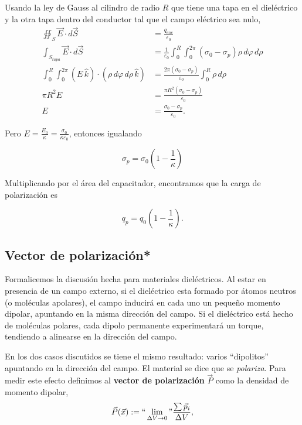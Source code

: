 Usando la ley de Gauss al cilindro de radio $R$ que tiene una tapa en el dieléctrico y la otra tapa dentro del conductor tal que el campo eléctrico sea nulo,
\begin{align*}
    \oiint_S \Vec{E} \cdot d\Vec{S} &= \frac{q_{enc}}{\varepsilon_0} \\
    \int_{S_{tapa}} \Vec{E} \cdot d\Vec{S} &= \frac{1}{\varepsilon_0}\int_0^R \int_0^{2\pi} (\sigma_0 - \sigma_p) \rho\,d\varphi\,d\rho \\
    \int_0^R \int_0^{2 \pi} (E\,\hat{k}) \cdot (\rho \,d\varphi \,d\rho \,\hat{k}) &= \frac{2\pi (\sigma_0 - \sigma_p)}{\varepsilon_0} \int_0^R \rho \,d\rho \\
    \pi R^2 E &= \frac{\pi R^2(\sigma_0 - \sigma_p)}{\varepsilon_0} \\
    E&= \frac{\sigma_0 - \sigma_p}{\varepsilon_0}.
\end{align*}

Pero $E =  \frac{E_0}{\kappa} = \frac{\sigma_0}{\kappa \varepsilon_0}$, entonces igualando 
\begin{shaded}
 \begin{equation}
\sigma_p = \sigma_0 \left(  1- \frac{1}{\kappa} \right) \label{densidadDePolarizacion}
\end{equation}
\end{shaded}

Multiplicando por el área del capacitador, encontramos que la carga de polarización es
\begin{shaded}
    $$q_p = q_0 \left(  1- \frac{1}{\kappa} \right).$$
\end{shaded}

\subsection{Vector de polarización*}

Formalicemos la discusión hecha para materiales dieléctricos. Al estar en presencia de un campo externo, si el dieléctrico esta formado por átomos neutros (o moléculas apolares), el campo inducirá en cada uno un pequeño momento dipolar, apuntando en la misma dirección del campo. Si el dieléctrico está hecho de moléculas polares, cada dipolo permanente experimentará un torque, tendiendo a alinearse en la dirección del campo. 

En los dos casos discutidos se tiene el mismo resultado: varios ``dipolitos'' apuntando en la dirección del campo. El material se dice que se \textit{polariza}. Para medir este efecto definimos al  \textbf{vector de polarización} $\Vec{P}$ como la densidad de momento dipolar,
$$\Vec{P}(\Vec{x}) := ``\lim_{\Delta V \to 0}" \frac{\sum \Vec{p}_i}{\Delta V},$$

